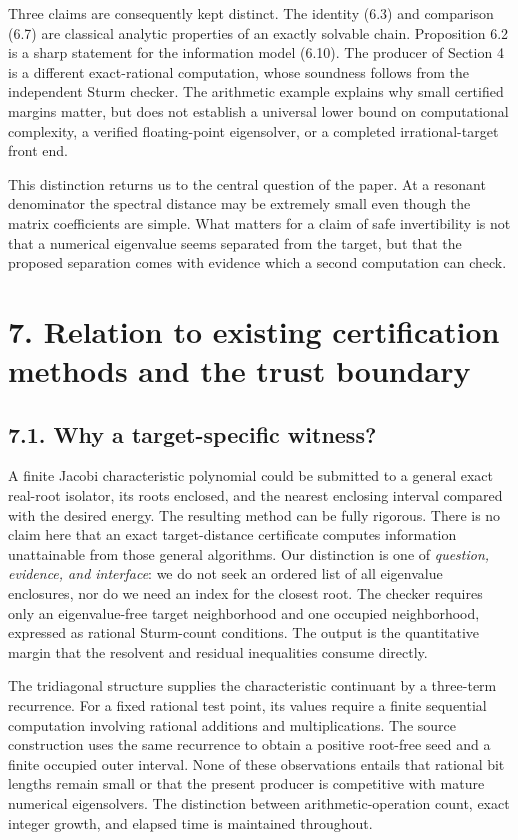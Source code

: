 \documentclass[
  11pt,
]{article}
\begin{document}
Three claims are consequently kept distinct. The identity (6.3) and
comparison (6.7) are classical analytic properties of an exactly
solvable chain. Proposition 6.2 is a sharp statement for the information
model (6.10). The producer of Section 4 is a different exact-rational
computation, whose soundness follows from the independent Sturm checker.
The arithmetic example explains why small certified margins matter, but
does not establish a universal lower bound on computational complexity,
a verified floating-point eigensolver, or a completed irrational-target
front end.

This distinction returns us to the central question of the paper. At a
resonant denominator the spectral distance may be extremely small even
though the matrix coefficients are simple. What matters for a claim of
safe invertibility is not that a numerical eigenvalue seems separated
from the target, but that the proposed separation comes with evidence
which a second computation can check.

\section{7. Relation to existing certification methods and the trust
boundary}\label{relation-to-existing-certification-methods-and-the-trust-boundary}

\subsection{7.1. Why a target-specific
witness?}\label{why-a-target-specific-witness}

A finite Jacobi characteristic polynomial could be submitted to a
general exact real-root isolator, its roots enclosed, and the nearest
enclosing interval compared with the desired energy. The resulting
method can be fully rigorous. There is no claim here that an exact
target-distance certificate computes information unattainable from those
general algorithms. Our distinction is one of \emph{question, evidence,
and interface}: we do not seek an ordered list of all eigenvalue
enclosures, nor do we need an index for the closest root. The checker
requires only an eigenvalue-free target neighborhood and one occupied
neighborhood, expressed as rational Sturm-count conditions. The output
is the quantitative margin that the resolvent and residual inequalities
consume directly.

The tridiagonal structure supplies the characteristic continuant by a
three-term recurrence. For a fixed rational test point, its values
require a finite sequential computation involving rational additions and
multiplications. The source construction uses the same recurrence to
obtain a positive root-free seed and a finite occupied outer interval.
None of these observations entails that rational bit lengths remain
small or that the present producer is competitive with mature numerical
eigensolvers. The distinction between arithmetic-operation count, exact
integer growth, and elapsed time is maintained throughout.
\end{document}
